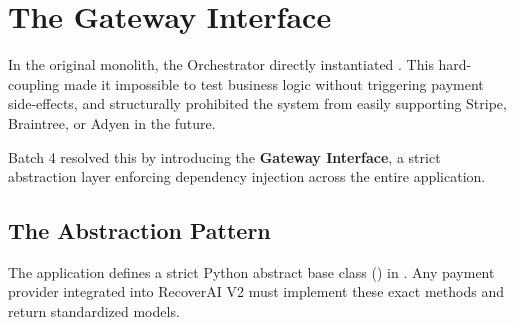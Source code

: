 
\section{The Gateway Interface}

\begin{tcolorbox}[summarybox={\iconFlow[1.5] Abstracting the External World}]
\color{textdark}
In the original monolith, the Orchestrator directly instantiated . This hard-coupling made it impossible to test business logic without triggering payment side-effects, and structurally prohibited the system from easily supporting Stripe, Braintree, or Adyen in the future.

Batch 4 resolved this by introducing the \textbf{Gateway Interface}, a strict abstraction layer enforcing dependency injection across the entire application.
\end{tcolorbox}

\vspace{0.8cm}

\subsection{The Abstraction Pattern}

The application defines a strict Python abstract base class () in . Any payment provider integrated into RecoverAI V2 must implement these exact methods and return standardized  models.


